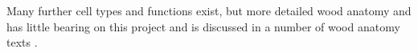 Many further cell types and functions exist, but more detailed wood anatomy and
has little bearing on this project and is discussed in a number of wood anatomy
texts \cite{fromm2013cellular}.